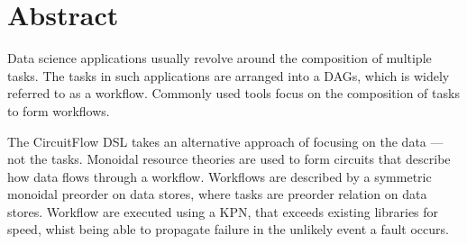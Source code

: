 \documentclass[dissertation.tex]{subfiles}
\begin{document}
\chapter*{Abstract}\label{chap:abstract}

Data science applications usually revolve around the composition of multiple tasks.
The tasks in such applications are arranged into a \acfp{DAG}, which is widely referred to as a workflow.
Commonly used tools focus on the composition of tasks to form workflows.

The CircuitFlow \ac{DSL} takes an alternative approach of focusing on the data --- not the tasks.
Monoidal resource theories are used to form circuits that describe how data flows through a workflow.
Workflows are described by a symmetric monoidal preorder on data stores, where tasks are preorder relation on data stores.
Workflow are executed using a \acf{KPN}, that exceeds existing libraries for speed, whist being able to propagate failure in the unlikely event a fault occurs.






\end{document}
